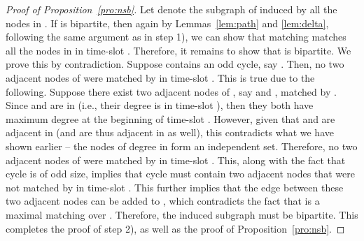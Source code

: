 \documentclass[10pt,journal,compsoc]{IEEEtran}
\begin{document}
\begin{proof}[Proof of Proposition~\ref{pro:nsb}]
Let  denote the subgraph of  induced by all the nodes in 
. If  is bipartite, then again by Lemmas~\ref{lem:path} 
and \ref{lem:delta}, following the same argument as in step 1), we can show that matching 
 matches all the nodes in  in time-slot . Therefore, it 
remains to show that  is bipartite. We prove this by contradiction. 
Suppose  contains an odd cycle, say . Then, no two adjacent nodes 
of  were matched by  in time-slot . This is true due to the following. 
Suppose there exist two adjacent nodes of , say  and , matched by . 
Since  and  are in  (i.e., their degree is  in time-slot ), then
they both have maximum degree  at the beginning of time-slot . However, given 
that  and  are adjacent in  (and are thus adjacent in  as well), 
this contradicts what we have shown earlier -- the nodes of degree  in  
form an independent set. Therefore, no two adjacent nodes of  were matched by  
in time-slot . This, along with the fact that cycle  is of odd size, implies that cycle  
must contain two adjacent nodes that were not matched by  in time-slot . This 
further implies that the edge between these two adjacent nodes can be added to , 
which contradicts the fact that  is a maximal matching over . Therefore, 
the induced subgraph  must be bipartite. This completes the proof of step 2), 
as well as the proof of Proposition~\ref{pro:nsb}.
\end{proof}
\end{document}
